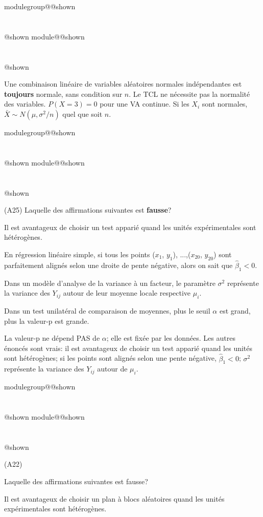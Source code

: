 \documentclass{Evaluation}
\makeatletter
\newcommand{\currentmodulekey}{}
\newcommand{\currentmoduletitle}{}
\newcommand{\currentgroupkey}{}
\newcommand{\currentgrouptitle}{}
\newcommand{\showmoduleifneeded}{%
  \ifx\currentgroupkey\empty\else
    \expandafter\ifx\csname modulegroup@\currentgroupkey @shown\endcsname\relax
      \section*{\currentgrouptitle}%
      \expandafter\gdef\csname modulegroup@\currentgroupkey @shown\endcsname{1}%
    \fi
  \fi
  \expandafter\ifx\csname module@\currentmodulekey @shown\endcsname\relax
    \section*{\currentmoduletitle}%
    \expandafter\gdef\csname module@\currentmodulekey @shown\endcsname{1}%
  \fi
}
\newenvironment{A22}{\showmoduleifneeded}{}
\newenvironment{A25}{\showmoduleifneeded}{}
\makeatother
\begin{document}
\begin{questions}
\begin{A25}
\begin{solution}
Une combinaison linéaire de variables aléatoires normales indépendantes est \textbf{toujours} normale, sans condition sur $n$. Le TCL ne nécessite pas la normalité des variables. $P(X=3) = 0$ pour une VA continue. Si les $X_i$ sont normales, $\bar{X} \sim N(\mu, \sigma^2/n)$ quel que soit $n$.
\end{solution}
\end{A25}

\begin{A25}
\question\label{QCManovaReg}
(A25)
Laquelle des affirmations suivantes est \textbf{fausse}?

\medskip

\begin{checkboxes}
\choice Il est avantageux de choisir un test apparié quand les unités expérimentales sont hétérogènes.

\choice En régression linéaire simple, si tous les points ($x_1$, $y_1$), ...,($x_{20}$, $y_{20}$) sont parfaitement alignés selon une droite de pente négative, alors on sait que $\widehat{\beta}_1 <0$.


\choice Dans un modèle d’analyse de la variance à un facteur, le paramètre $\sigma^2$ représente la variance
des $Y_{ij}$ autour de leur moyenne locale respective $\mu_i$.

\correctchoice Dans un test unilatéral de comparaison de moyennes, plus le seuil $\alpha$ est grand, plus la valeur-p est grande.


\end{checkboxes}

\begin{solution}
La valeur-p ne dépend PAS de $\alpha$; elle est fixée par les données. Les autres énoncés sont vrais: il est avantageux de choisir un test apparié quand les unités sont hétérogènes; si les points sont alignés selon une pente négative, $\hat{\beta}_1 < 0$; $\sigma^2$ représente la variance des $Y_{ij}$ autour de $\mu_i$.
\end{solution}
\end{A25}


\begin{A22}
\question
(A22)

Laquelle des affirmations suivantes est fausse?

\medskip

\begin{checkboxes}
\choice Il est avantageux de choisir un plan à blocs aléatoires quand les unités expérimentales sont hétérogènes.


\end{checkboxes}
\end{A22}
\end{questions}
\end{document}
